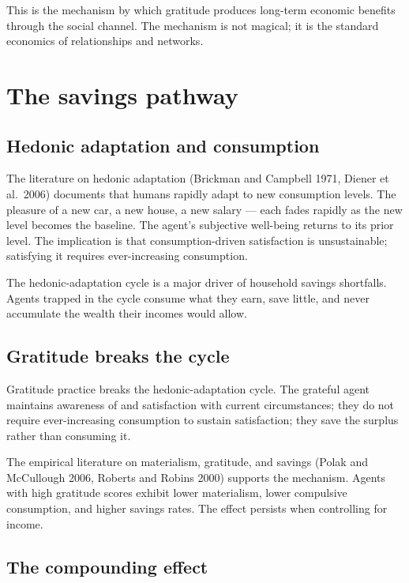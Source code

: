 This is the mechanism by which gratitude produces long-term
economic benefits through the social channel. The mechanism is
not magical; it is the standard economics of relationships and
networks.

\section{The savings pathway}
\label{sec:grat-saving}

\subsection{Hedonic adaptation and consumption}

The literature on hedonic adaptation (Brickman and Campbell 1971,
Diener et al.\ 2006) documents that humans rapidly adapt to new
consumption levels. The pleasure of a new car, a new house, a new
salary --- each fades rapidly as the new level becomes the
baseline. The agent's subjective well-being returns to its
prior level. The implication is that consumption-driven
satisfaction is unsustainable; satisfying it requires ever-increasing
consumption.

The hedonic-adaptation cycle is a major driver of household
savings shortfalls. Agents trapped in the cycle consume what they
earn, save little, and never accumulate the wealth their incomes
would allow.

\subsection{Gratitude breaks the cycle}

Gratitude practice breaks the hedonic-adaptation cycle. The
grateful agent maintains awareness of and satisfaction with current
circumstances; they do not require ever-increasing consumption to
sustain satisfaction; they save the surplus rather than consuming
it.

The empirical literature on materialism, gratitude, and savings
(Polak and McCullough 2006, Roberts and Robins 2000) supports the
mechanism. Agents with high gratitude scores exhibit lower
materialism, lower compulsive consumption, and higher savings
rates. The effect persists when controlling for income.

\subsection{The compounding effect}

